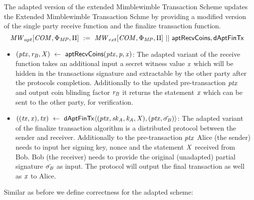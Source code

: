 \begin{definition}
    \label{def:apt-ext-mw-tx-scheme}
    The adapted version of the extended Mimblewimble Transaction Scheme updates the Extended Mimblewimble Transaction Schme by providing a modified version of the single party receive function and the finalize
    transaction function.
    \[ \mathit{MW}_{apt}[\mathit{COM},\Phi_{\mathit{MP}},\Pi] ~:=~ \mathit{MW}_{ext}[\mathit{COM},\Phi_{\mathit{MP}},\Pi] ~||~ \mathsf{aptRecvCoins}, \mathsf{dAptFinTx} \]
    \begin{itemize}
        \item $(\mathit{ptx}, \mathit{r}_{\mathit{B}}, \mathit{X}) ~\leftarrow~ \mathsf{aptRecvCoins}(\mathit{ptx},\mathit{p},\mathit{x})$: The adapted variant of the receive function takes an additional input a secret witness value
        $\mathit{x}$ which will be hidden in the transactions signature and extractable by the other party after the protocols completion. Additionally to the updated pre-transaction $\mathit{ptx}$ and output coin blinding factor $\mathit{r}_{\mathit{B}}$ it returns
        the statement $\mathit{x}$ which can be sent to the other party, for verification.
        \item $((\mathit{tx}, \mathit{x}), \mathit{tx}) ~\leftarrow~ \mathsf{dAptFinTx} \langle (\mathit{ptx},\mathit{sk}_{\mathit{A}},\mathit{\mathit{k}_{\mathit{A}}},\mathit{X}), (\mathit{ptx},\tilde{\sigma_{\mathit{B}}}) \rangle$: The adapted variant of the finalize transaction algorithm is a distributed protocol between the sender
        and receiver. Additionally to the pre-transaction $\mathit{ptx}$ Alice (the sender) needs to input her signing key, nonce and the statement $\mathit{X}$ received from Bob. Bob (the receiver) needs
        to provide the original (unadapted) partial signature $\tilde{\sigma_{\mathit{B}}}$ as input. The protocol will output the final transaction as well as $\mathit{x}$ to Alice.
    \end{itemize}
\end{definition}

Similar as before we define correctness for the adapted scheme:

